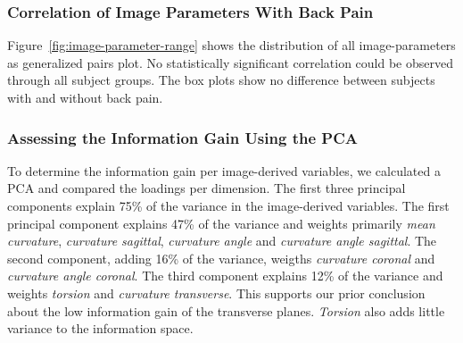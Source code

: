 \documentclass[a4paper,twoside]{style/article}
\begin{document}
\subsubsection{Correlation of Image Parameters With Back Pain}
Figure~\ref{fig:image-parameter-range} shows the distribution of all image-parameters as generalized pairs plot.
No statistically significant correlation could be observed through all subject groups.
The box plots show no difference between subjects with and without back pain.

\subsubsection{Assessing the Information Gain Using the PCA}
To determine the information gain per image-derived variables, we calculated a PCA and compared the loadings per dimension.
The first three principal components explain 75\% of the variance in the image-derived variables.
The first principal component explains 47\% of the variance and weights primarily \emph{mean curvature}, \emph{curvature sagittal}, \emph{curvature angle} and \emph{curvature angle sagittal}.
The second component, adding 16\% of the variance, weigths  \emph{curvature coronal} and \emph{curvature angle coronal}.
The third component explains 12\% of the variance and weights \emph{torsion} and \emph{curvature transverse}.
This supports our prior conclusion about the low information gain of the transverse planes.
\emph{Torsion} also adds little variance to the information space.
\end{document}
